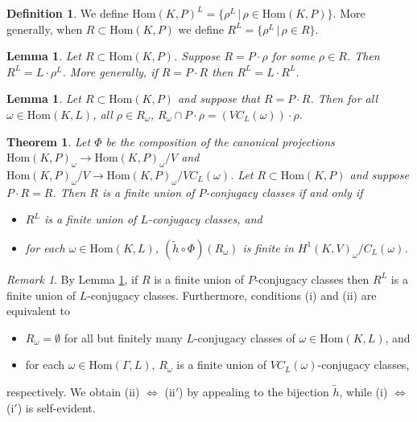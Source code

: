 \documentclass[12pt]{amsart}
\numberwithin{equation}{section}
\newtheorem{thm}[equation]{Theorem}
\newtheorem{lem}[equation]{Lemma}
\theoremstyle{definition}
\newtheorem{defn}[equation]{Definition}
\theoremstyle{remark}
\theoremstyle{remark}
\newtheorem*{Rem}{Remark}
\begin{document}
\begin{defn} We define
$\mathrm{Hom}(K, P)^L = \{\rho^L\,|\,\rho \in \mathrm{Hom}(K, P)\}$.
More generally, when $R \subset \mathrm{Hom}(K, P)$ we define
$R^L = \{\rho^L\,|\,\rho \in R\}$.
\end{defn}

\begin{lem} \label{pr:lrl} Let $R \subset \mathrm{Hom}(K, P)$. Suppose $R = P \cdot \rho$ for some $\rho \in R$. Then $R^L = L\cdot \rho^L$.
	More generally, if $R = P \cdot R$ then $R^L = L \cdot R^L$.
\end{lem}

\begin{lem} \label{rsigma:vcl} Let $R \subset \mathrm{Hom}(K, P)$ and suppose that $R = P \cdot R$. Then for all $\omega \in \mathrm{Hom}(K, L)$, all $\rho\in R_\omega$,
$R_\omega \cap P \cdot \rho = \left(VC_L(\omega)\right) \cdot \rho$.
\end{lem}

\begin{thm}\label{r:finite_p} Let $\Phi$ be the composition of the canonical projections $\mathrm{Hom}(K, P)_\omega \rightarrow \mathrm{Hom}(K, P)_\omega/V$ and $\mathrm{Hom}(K, P)_\omega/V \rightarrow \mathrm{Hom}(K, P)_\omega/VC_L(\omega)$. Let $R \subset \mathrm{Hom}(K, P)$ and suppose $P \cdot R = R$. Then $R$ is a finite union of $P$-conjugacy classes if and only if
\begin{itemize}
\item[(i)] $R^L$ is a finite union of $L$-conjugacy classes, and
\item[(ii)] for each $\omega \in \mathrm{Hom}(K, L)$, $(\tilde{h} \circ \Phi)(R_\omega)$ is finite in $H^1(K, V)_\omega/C_L(\omega)$.
\end{itemize}
\end{thm}
\begin{Rem} By Lemma \ref{pr:lrl}, if $R$ is a finite union of $P$-conjugacy classes then $R^L$ is a finite union of $L$-conjugacy classes. Furthermore, conditions (i) and (ii) are equivalent to 
\begin{itemize}
\item[(i$'$)] $R_\omega = \emptyset$ for all but finitely many $L$-conjugacy classes of $\omega \in \mathrm{Hom}(K, L)$, and
\item[(ii$'$)] for each $\omega \in \mathrm{Hom}(\Gamma, L)$, $R_\omega$ is a finite union of $VC_L(\omega)$-conjugacy classes,
\end{itemize}
respectively. We obtain (ii) $\Leftrightarrow$ (ii$'$) by appealing to the bijection $\tilde{h}$, while (i) $\Leftrightarrow$ (i$'$) is self-evident.
\end{Rem}
\end{document}
